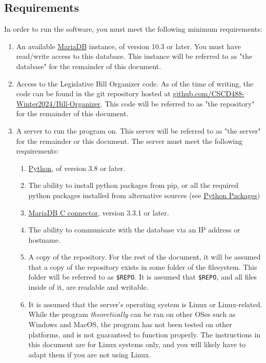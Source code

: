 \documentclass{article}
\begin{document}
\subsection{Requirements}

In order to run the software, you must meet the following minimum requirements:

\begin{enumerate}
    \item An available \href{https://mariadb.org/download/}{MariaDB} instance, of version 10.3 or later. You must have read/write access to this database. This instance will be referred to as "the database" for the remainder of this document.

    \item Access to the Legislative Bill Organizer code. As of the time of writing, the code can be found in the git repository hosted at \href{https://github.com/CSCD488-Winter2024/Bill-Organizer}{github.com/CSCD488-Winter2024/Bill-Organizer}. This code will be referred to as "the repository" for the remainder of this document.

    \item A server to run the program on. This server will be referred to as "the server" for the remainder or this document. The server must meet the following requirements: 
        \begin{enumerate}
            \item \href{https://www.python.org/downloads/}{Python}, of version 3.8 or later.
            \item The ability to install python packages from pip, or all the required python packages installed from alternative sources (see \hyperref[sec:admin:pip]{Python Packages})
            \item \href{https://mariadb.com/downloads/connectors/}{MariaDB C connector}, version 3.3.1 or later.
            \item The ability to communicate with the database via an IP address or hostname.
            \item A copy of the repository. For the rest of the document, it will be assumed that a copy of the repository exists in some folder of the filesystem. This folder will be referred to as \verb_$REPO_. It is assumed that \verb_$REPO_, and all files inside of it, are readable and writable.
            \item It is assumed that the server's operating system is Linux or Linux-related. While the program \textit{theoretically} can be ran on other OSes such as Windows and MacOS, the program has not been tested on other platforms, and is not guaranteed to function properly. The instructions in this document are for Linux systems only, and you will likely have to adapt them if you are not using Linux.
        \end{enumerate}
\end{enumerate}
\end{document}
